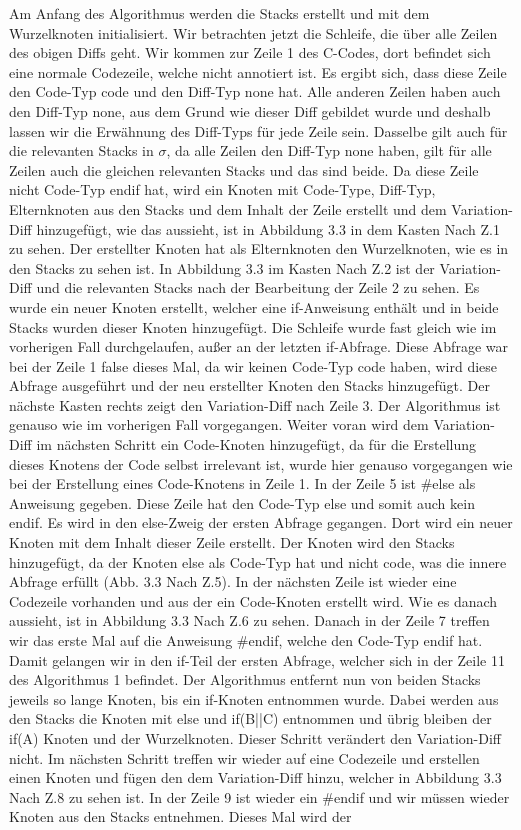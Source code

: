 Am Anfang des Algorithmus werden die Stacks erstellt und mit dem Wurzelknoten  initialisiert. Wir betrachten jetzt die Schleife, die über alle Zeilen des obigen Diffs geht. Wir kommen zur Zeile 1 des C-Codes, dort befindet sich eine normale Codezeile, welche nicht annotiert ist. Es ergibt sich, dass diese Zeile den Code-Typ code und den Diff-Typ none hat. Alle anderen Zeilen haben auch den Diff-Typ none, aus dem Grund wie dieser Diff gebildet wurde und deshalb lassen wir die Erwähnung des Diff-Typs für jede Zeile sein. Dasselbe gilt auch für die relevanten Stacks in $\sigma$, da alle Zeilen den Diff-Typ none haben, gilt für alle Zeilen auch die gleichen relevanten Stacks und das sind beide. Da diese Zeile nicht Code-Typ endif hat, wird ein Knoten mit Code-Type, Diff-Typ, Elternknoten aus den Stacks und dem Inhalt der Zeile erstellt und dem Variation-Diff hinzugefügt, wie das aussieht, ist in Abbildung 3.3 in dem Kasten \glqq Nach Z.1\grqq{} zu sehen. Der erstellter Knoten hat als Elternknoten den Wurzelknoten, wie es in den Stacks zu sehen ist. In Abbildung 3.3 im Kasten \glqq Nach Z.2\grqq{} ist der Variation-Diff und die relevanten Stacks nach der Bearbeitung der Zeile 2 zu sehen. Es wurde ein neuer Knoten erstellt, welcher eine if-Anweisung enthält und in beide Stacks wurden dieser Knoten hinzugefügt. Die Schleife wurde fast gleich wie im vorherigen Fall durchgelaufen, außer an der letzten if-Abfrage. Diese Abfrage war bei der Zeile 1 false dieses Mal, da wir keinen Code-Typ code haben, wird diese Abfrage ausgeführt und der neu erstellter Knoten den Stacks hinzugefügt. Der nächste Kasten rechts zeigt den Variation-Diff nach Zeile 3. Der Algorithmus ist genauso wie im vorherigen Fall vorgegangen. Weiter voran wird dem Variation-Diff im nächsten Schritt ein Code-Knoten hinzugefügt, da für die Erstellung dieses Knotens der Code selbst irrelevant ist, wurde hier genauso vorgegangen wie bei der Erstellung eines Code-Knotens in Zeile 1. In der Zeile 5 ist \#else als Anweisung gegeben. Diese Zeile hat den Code-Typ else und somit auch kein endif. Es wird in den else-Zweig der ersten Abfrage gegangen. Dort wird ein neuer Knoten mit dem Inhalt dieser Zeile erstellt. Der Knoten wird den Stacks hinzugefügt, da der Knoten else  als Code-Typ hat und nicht code, was die innere Abfrage erfüllt (Abb. 3.3 \glqq Nach Z.5\grqq{}). In der nächsten Zeile ist wieder eine Codezeile vorhanden und aus der ein Code-Knoten erstellt wird. Wie es danach aussieht, ist in Abbildung 3.3 \glqq Nach Z.6\grqq{} zu sehen. Danach in der Zeile 7 treffen wir das erste Mal auf die Anweisung \#endif, welche den Code-Typ endif hat. Damit gelangen wir in den if-Teil der ersten Abfrage, welcher sich in der Zeile 11 des Algorithmus 1 befindet. Der Algorithmus entfernt nun von beiden Stacks jeweils so lange Knoten, bis ein if-Knoten entnommen wurde. Dabei werden aus den Stacks die Knoten mit else und if(B||C) entnommen und übrig bleiben der if(A) Knoten und der Wurzelknoten. Dieser Schritt verändert den Variation-Diff nicht. Im nächsten Schritt treffen wir wieder auf eine Codezeile und erstellen einen Knoten und fügen den dem Variation-Diff hinzu, welcher in Abbildung 3.3 \glqq Nach Z.8\grqq{} zu sehen ist. In der Zeile 9 ist wieder ein \#endif und wir müssen wieder Knoten aus den Stacks entnehmen. Dieses Mal wird der 